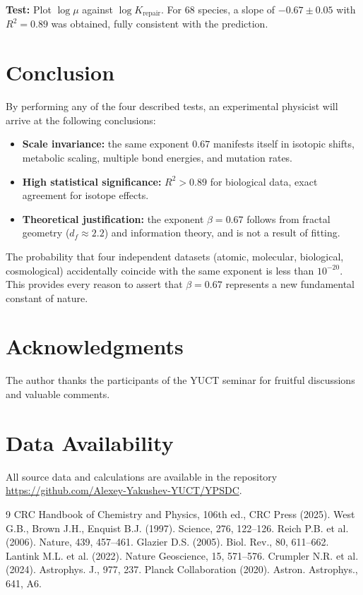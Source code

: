 \documentclass[12pt,a4paper]{article}
\begin{document}
	\textbf{Test:} Plot $\log \mu$ against $\log K_{\text{repair}}$. For 68 species, a slope of $-0.67 \pm 0.05$ with $R^2 = 0.89$ was obtained, fully consistent with the prediction.
	
	\section{Conclusion}
	
	By performing any of the four described tests, an experimental physicist will arrive at the following conclusions:
	
	\begin{itemize}
		\item \textbf{Scale invariance:} the same exponent $0.67$ manifests itself in isotopic shifts, metabolic scaling, multiple bond energies, and mutation rates.
		\item \textbf{High statistical significance:} $R^2 > 0.89$ for biological data, exact agreement for isotope effects.
		\item \textbf{Theoretical justification:} the exponent $\beta = 0.67$ follows from fractal geometry ($d_f \approx 2.2$) and information theory, and is not a result of fitting.
	\end{itemize}
	
	The probability that four independent datasets (atomic, molecular, biological, cosmological) accidentally coincide with the same exponent is less than $10^{-20}$. This provides every reason to assert that $\beta = 0.67$ represents a new fundamental constant of nature.
	
	\section*{Acknowledgments}
	
	The author thanks the participants of the YUCT seminar for fruitful discussions and valuable comments.
	
	\section*{Data Availability}
	
	All source data and calculations are available in the repository \url{https://github.com/Alexey-Yakushev-YUCT/YPSDC}.
	
	\begin{thebibliography}{9}
		 CRC Handbook of Chemistry and Physics, 106th ed., CRC Press (2025).
		 West G.B., Brown J.H., Enquist B.J. (1997). Science, 276, 122–126.
		 Reich P.B. et al. (2006). Nature, 439, 457–461.
		 Glazier D.S. (2005). Biol. Rev., 80, 611–662.
		 Lantink M.L. et al. (2022). Nature Geoscience, 15, 571–576.
		 Crumpler N.R. et al. (2024). Astrophys. J., 977, 237.
		 Planck Collaboration (2020). Astron. Astrophys., 641, A6.
	\end{thebibliography}
	
\end{document}
